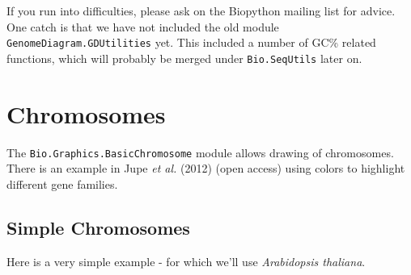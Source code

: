 If you run into difficulties, please ask on the Biopython mailing list for
advice. One catch is that we have not included the old module
\verb|GenomeDiagram.GDUtilities| yet.  This included a number of
GC\% related functions, which will probably be merged under
\verb|Bio.SeqUtils| later on.

\section{Chromosomes}

The \verb|Bio.Graphics.BasicChromosome| module allows drawing of chromosomes.
There is an example in Jupe \textit{et al.} (2012) \cite{jupe2012}
(open access) using colors to highlight different gene families.

\subsection{Simple Chromosomes}
Here is a very simple example - for which we'll use \textit{Arabidopsis thaliana}.

